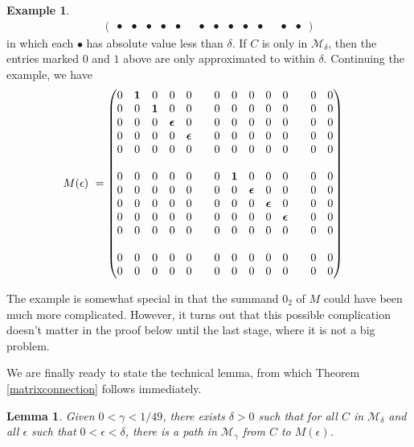\documentclass{amsart}
\newtheorem{lemma}[theorem]{Lemma}
\theoremstyle{definition}
\newtheorem{example}[theorem]{Example}
\theoremstyle{remark}
\numberwithin{equation}{section}
\begin{document}
{{\begin{example}
\begin{align*}
\begin{pmatrix}
{\bullet} &{\bullet} &{\bullet} &{\bullet} &{\bullet} & &{\bullet} &{\bullet} &{\bullet} &{\bullet} &{\bullet} & &{\bullet} &{\bullet} 
\end{pmatrix} 
\end{align*}
in which each ${\bullet}$ has absolute value less than $\delta$.
If $C$ is only in $\mathcal M_{\delta}$, then the entries marked 
$0$ and $1$ above are only approximated to within $\delta$. 
Continuing the example, we have 
\begin{align*}
\setcounter{MaxMatrixCols}{14} 
M(\epsilon ) \ &= 
\begin{pmatrix} 
0&\mathbf 1 &0&0&0&& 0&0&0&0&0&& 0&0 \\
0&0&\mathbf 1 &0&0&& 0&0&0&0&0&& 0&0 \\ 
0&0&0&\boldsymbol\epsilon   &0&& 0&0&0&0&0&& 0&0 \\ 
0&0&0&0&\boldsymbol\epsilon   && 0&0&0&0&0&& 0&0 \\ 
0&0&0&0&0&& 0&0&0&0&0&& 0&0 \\ 
 & & & & & & & & & & &  & & \\
0&0&0&0&0&  & 0&\mathbf 1 &0&0&0            & &0&0 \\
0&0&0&0&0&  & 0&0&\boldsymbol\epsilon   &0&0& &0&0 \\ 
0&0&0&0&0&  & 0&0&0&\boldsymbol\epsilon   &0& &0&0 \\ 
0&0&0&0&0&  & 0&0&0&0&\boldsymbol\epsilon   & &0&0 \\ 
0&0&0&0&0&  & 0&0&0&0&0                     & &0&0 \\ 
 & & & & & & & & & & &  & & \\
0&0&0&0&0&& 0&0&0&0&0&& 0&0 \\ 
0&0&0&0&0&& 0&0&0&0&0&& 0&0 
\end{pmatrix} 
\end{align*} 
\end{example} 
The example is somewhat special in that the summand 
$0_2$ of $M$ could have been much more complicated. 
However, it turns out that this possible complication 
doesn't matter in the proof below until the last stage, 
where it is not a big problem. 

We are finally ready to state the technical lemma, 
from which Theorem \ref{matrixconnection} follows immediately. 

\begin{lemma} \label{blockconnectionlemma} 
Given $0< \gamma <1/49$, there exists $\delta >0$ such that 
for all $C$ in $\mathcal M_{\delta}$ and all $\epsilon $ 
such that $0<\epsilon < \delta$, there is a path in 
$\mathcal M_{\gamma}$ from $C$ to 
 $M(\epsilon )$. 
\end{lemma} 

}}
\end{document}
